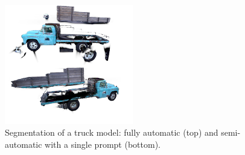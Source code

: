 \documentclass[twocolumn]{article}
\begin{document}
	\begin{figure}[h!]
		\centering
		\includegraphics[width=0.5\textwidth]{Images/trucks.png}
		\caption{Segmentation of a truck model: fully automatic (top) and semi-automatic with a single prompt (bottom).}
		\label{fig:trucks}
	\end{figure}
	\FloatBarrier
	\noindent
\end{document}
